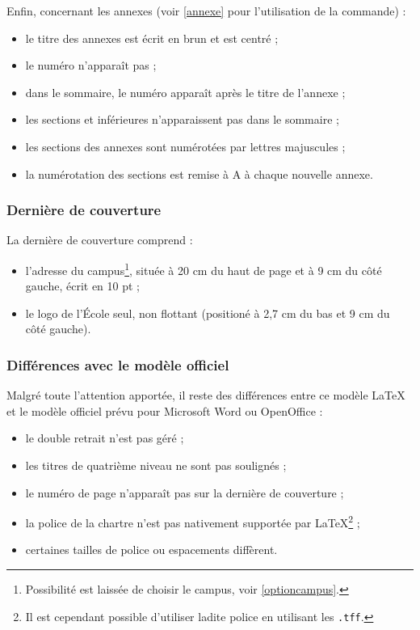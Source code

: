 \noindent Enfin, concernant les annexes (voir \ref{annexe} pour l'utilisation de la commande) :
\begin{itemize}
	\item le titre des annexes est écrit en brun et est centré ;
	\item le numéro n'apparaît pas ;
	\item dans le sommaire, le numéro apparaît après le titre de l'annexe ;
	\item les sections et inférieures n'apparaissent pas dans le sommaire ;
	\item les sections des annexes sont numérotées par lettres  majuscules ;
	\item la numérotation des sections est remise à \og A \fg{} à chaque nouvelle annexe.
\end{itemize}\bigskip

\subsubsection{Dernière de couverture}

La dernière de couverture comprend :
\begin{itemize}
	\item l'adresse du campus\footnote{Possibilité est laissée de choisir le campus, voir \ref{optioncampus}.}, située à 20 cm du haut de page et à 9 cm du côté gauche, écrit en 10 pt ;
	\item le logo de l'École seul, non flottant (positioné à 2,7 cm du bas et 9 cm du côté gauche).
\end{itemize}

\subsubsection{Différences avec le modèle officiel}

Malgré toute l'attention apportée, il reste des différences entre ce modèle \LaTeX{} et le modèle officiel prévu pour Microsoft Word ou OpenOffice :
\begin{itemize}
	\item le double retrait n'est pas géré ;
	\item les titres de quatrième niveau ne sont pas soulignés ;
	\item le numéro de page n'apparaît pas sur la dernière de couverture ;
	\item la police de la chartre n'est pas nativement supportée par \LaTeX\footnote{Il est cependant possible d'utiliser ladite police en utilisant les \texttt{.tff}.}{} ;
	\item certaines tailles de police ou espacements diffèrent.
\end{itemize} \bigskip

